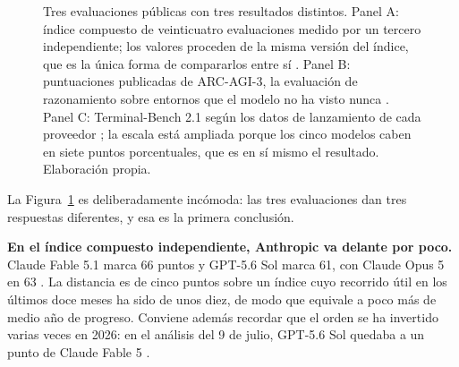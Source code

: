 \documentclass[11pt,letterpaper]{article}
\newcommand{\barrarot}[6]{%
  \node[left, text width=4.2cm, align=right, font=\scriptsize] at (-0.15,#1) {#4};%
  \fill[#3] (0,#1-0.17) rectangle (#2,#1+0.17);%
  \node[right, font=\scriptsize] at (#6,#1) {#5};%
}
\begin{document}
\begin{figure}[tbp]
  \caption{Tres evaluaciones públicas con tres resultados distintos. Panel A:
  índice compuesto de veinticuatro evaluaciones medido por un tercero
  independiente; los valores proceden de la misma versión del índice, que es la
  única forma de compararlos entre sí
  \parencite{aa2026modelos,aa2026comparacion}. Panel B: puntuaciones publicadas
  de ARC-AGI-3, la evaluación de razonamiento sobre entornos que el modelo no ha
  visto nunca \parencite{arcagi3,benchlm2026arc}. Panel C: Terminal-Bench 2.1
  según los datos de lanzamiento de cada proveedor
  \parencite{openai2026sol,anthropic2026opus5}; la escala está ampliada porque
  los cinco modelos caben en siete puntos porcentuales, que es en sí mismo el
  resultado. Elaboración propia.}
  \label{fig:benchmarks}
\end{figure}

La Figura~\ref{fig:benchmarks} es deliberadamente incómoda: las tres
evaluaciones dan tres respuestas diferentes, y esa es la primera conclusión.

\textbf{En el índice compuesto independiente, Anthropic va delante por poco.}
Claude Fable 5.1 marca 66 puntos y GPT-5.6 Sol marca 61, con Claude Opus 5 en 63
\parencite{aa2026modelos,aa2026comparacion}. La distancia es de cinco puntos
sobre un índice cuyo recorrido útil en los últimos doce meses ha sido de unos
diez, de modo que equivale a poco más de medio año de progreso. Conviene además
recordar que el orden se ha invertido varias veces en 2026: en el análisis del 9
de julio, GPT-5.6 Sol quedaba a un punto de Claude Fable 5
\parencite{aa2026gpt56}.
\end{document}
